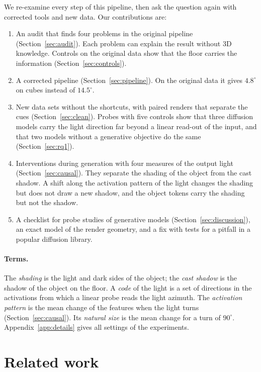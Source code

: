\documentclass[10pt]{article}
\newcommand{\degr}{^\circ}
\begin{document}
We re-examine every step of this pipeline, then ask the question again with corrected tools and new data.
Our contributions are:
\begin{enumerate}
    \item An audit that finds four problems in the original pipeline (Section~\ref{sec:audit}). Each problem can explain the result without 3D knowledge. Controls on the original data show that the floor carries the information (Section~\ref{sec:controls}).
    \item A corrected pipeline (Section~\ref{sec:pipeline}). On the original data it gives $4.8\degr$ on cubes instead of $14.5\degr$.
    \item New data sets without the shortcuts, with paired renders that separate the cues (Section~\ref{sec:clean}). Probes with five controls show that three diffusion models carry the light direction far beyond a linear read-out of the input, and that two models without a generative objective do the same (Section~\ref{sec:rq1}).
    \item Interventions during generation with four measures of the output light (Section~\ref{sec:causal}). They separate the shading of the object from the cast shadow. A shift along the activation pattern of the light changes the shading but does not draw a new shadow, and the object tokens carry the shading but not the shadow.
    \item A checklist for probe studies of generative models (Section~\ref{sec:discussion}), an exact model of the render geometry, and a fix with tests for a pitfall in a popular diffusion library.
\end{enumerate}

\paragraph{Terms.}
The \emph{shading} is the light and dark sides of the object; the \emph{cast shadow} is the shadow of the object on the floor.
A \emph{code} of the light is a set of directions in the activations from which a linear probe reads the light azimuth.
The \emph{activation pattern} is the mean change of the features when the light turns (Section~\ref{sec:causal}). Its \emph{natural size} is the mean change for a turn of $90\degr$.
Appendix~\ref{app:details} gives all settings of the experiments.

\section{Related work}
\label{sec:related}
\end{document}
